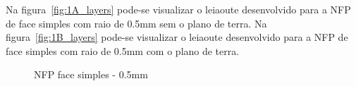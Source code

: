 Na figura~\ref{fig:1A_layers} pode-se visualizar o leiaoute desenvolvido para a NFP de face simples com raio de 0.5mm sem o plano de terra. Na figura~\ref{fig:1B_layers} pode-se visualizar o leiaoute desenvolvido para a NFP de face simples com raio de 0.5mm com o plano de terra.
\begin{figure}[htb!]
	\centering
 	\caption{NFP face simples - 0.5mm}
\end{figure}

